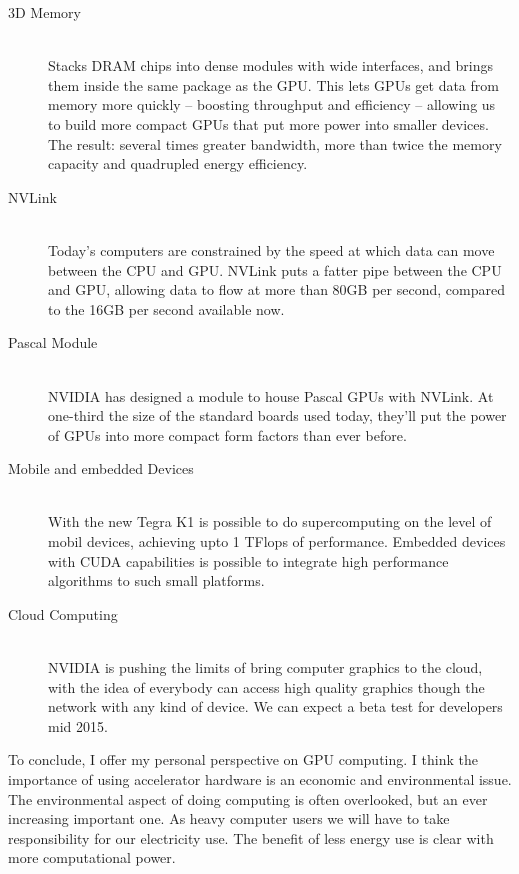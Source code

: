 \begin{description}
  \item[3D Memory] \hfill \\
 Stacks DRAM chips into dense modules with wide interfaces, and brings them inside the same package as the GPU. This lets GPUs get data from memory more quickly – boosting throughput and efficiency – allowing us to build more compact GPUs that put more power into smaller devices. The result: several times greater bandwidth, more than twice the memory capacity and quadrupled energy efficiency.
  
  \item[NVLink] \hfill \\
 Today’s computers are constrained by the speed at which data can move between the CPU and GPU. NVLink puts a fatter pipe between the CPU and GPU, allowing data to flow at more than 80GB per second, compared to the 16GB per second available now.
 
 \item[Pascal Module] \hfill \\ 
  NVIDIA has designed a module to house Pascal GPUs with NVLink. At one-third the size of the standard boards used today, they’ll put the power of GPUs into more compact form factors than ever before.
  
   \item[Mobile and embedded Devices] \hfill \\ 
   With the new Tegra K1 is possible to do supercomputing on the level of mobil devices, achieving upto 1 TFlops of performance. Embedded devices with CUDA capabilities is possible to integrate high performance algorithms to such small platforms. 
   \item[Cloud Computing] \hfill \\ 
   NVIDIA is pushing the limits of bring computer graphics to the cloud, with the idea of everybody can access high quality graphics though the network with any kind of device. We can expect a beta test for developers mid 2015.
 
  \end{description}

To conclude, I offer my personal perspective on GPU computing. I think the importance of using accelerator hardware is an economic and environmental issue. The environmental aspect of doing computing is often overlooked, but an ever increasing important one. As heavy computer users we will have to take responsibility for our electricity use. The benefit of less energy use is clear with more computational power.